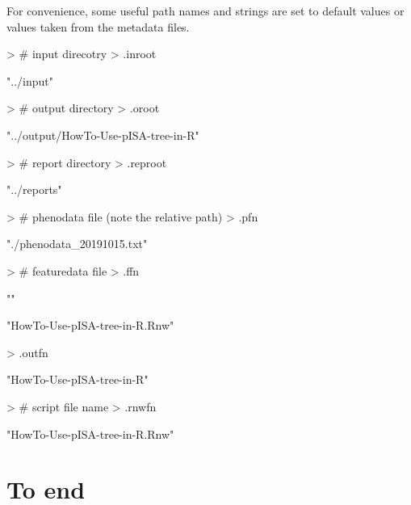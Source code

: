 \documentclass[a4paper,12pt]{article}\usepackage[]{graphicx}\usepackage[]{color}
\begin{document}
For convenience, some useful path names and strings are set to default values or values taken from the metadata files.

\begin{Schunk}
\begin{Sinput}
> # input direcotry
> .inroot
\end{Sinput}
\begin{Soutput}
[1] "../input"
\end{Soutput}
\begin{Sinput}
> # output directory
> .oroot
\end{Sinput}
\begin{Soutput}
[1] "../output/HowTo-Use-pISA-tree-in-R"
\end{Soutput}
\begin{Sinput}
> # report directory
> .reproot
\end{Sinput}
\begin{Soutput}
[1] "../reports"
\end{Soutput}
\begin{Sinput}
> # phenodata file (note the relative path)
> .pfn
\end{Sinput}
\begin{Soutput}
[1] "./phenodata_20191015.txt"
\end{Soutput}
\begin{Sinput}
> # featuredata file
> .ffn
\end{Sinput}
\begin{Soutput}
[1] ""
\end{Soutput}
\begin{Soutput}
[1] "HowTo-Use-pISA-tree-in-R.Rnw"
\end{Soutput}
\begin{Sinput}
> .outfn
\end{Sinput}
\begin{Soutput}
[1] "HowTo-Use-pISA-tree-in-R"
\end{Soutput}
\begin{Sinput}
> # script file name
> .rnwfn
\end{Sinput}
\begin{Soutput}
[1] "HowTo-Use-pISA-tree-in-R.Rnw"
\end{Soutput}
\end{Schunk}



\clearpage
\section{To end}
\end{document}
